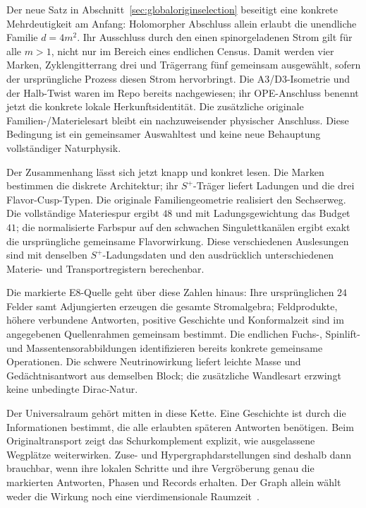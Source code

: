 Der neue Satz in Abschnitt~\ref{sec:globaloriginselection} beseitigt eine konkrete Mehrdeutigkeit am Anfang: Holomorpher Abschluss allein erlaubt die unendliche Familie $d=4m^2$. Ihr Ausschluss durch den einen spinorgeladenen Strom gilt für alle $m>1$, nicht nur im Bereich eines endlichen Census. Damit werden vier Marken, Zyklengitterrang drei und Trägerrang fünf gemeinsam ausgewählt, sofern der ursprüngliche Prozess diesen Strom hervorbringt. Die A3/D3-Isometrie und der Halb-Twist waren im Repo bereits nachgewiesen; ihr OPE-Anschluss benennt jetzt die konkrete lokale Herkunftsidentität. Die zusätzliche originale Familien-/Materielesart bleibt ein nachzuweisender physischer Anschluss. Diese Bedingung ist ein gemeinsamer Auswahltest und keine neue Behauptung vollständiger Naturphysik.

Der Zusammenhang lässt sich jetzt knapp und konkret lesen. Die Marken bestimmen die diskrete Architektur; ihr $S^+$-Träger liefert Ladungen und die drei Flavor-Cusp-Typen. Die originale Familiengeometrie realisiert den Sechserweg. Die vollständige Materiespur ergibt $48$ und mit Ladungsgewichtung das Budget $41$; die normalisierte Farbspur auf den schwachen Singulettkanälen ergibt exakt die ursprüngliche gemeinsame Flavorwirkung. Diese verschiedenen Auslesungen sind mit denselben $S^+$-Ladungsdaten und den ausdrücklich unterschiedenen Materie- und Transportregistern berechenbar.

Die markierte E8-Quelle geht über diese Zahlen hinaus: Ihre ursprünglichen $24$ Felder samt Adjungierten erzeugen die gesamte Stromalgebra; Feldprodukte, höhere verbundene Antworten, positive Geschichte und Konformalzeit sind im angegebenen Quellenrahmen gemeinsam bestimmt. Die endlichen Fuchs-, Spinlift- und Massentensorabbildungen identifizieren bereits konkrete gemeinsame Operationen. Die schwere Neutrinowirkung liefert leichte Masse und Gedächtnisantwort aus demselben Block; die zusätzliche Wandlesart erzwingt keine unbedingte Dirac-Natur.

Der Universalraum gehört mitten in diese Kette. Eine Geschichte ist durch die Informationen bestimmt, die alle erlaubten späteren Antworten benötigen. Beim Originaltransport zeigt das Schurkomplement explizit, wie ausgelassene Wegplätze weiterwirken. Zuse- und Hypergraphdarstellungen sind deshalb dann brauchbar, wenn ihre lokalen Schritte und ihre Vergröberung genau die markierten Antworten, Phasen und Records erhalten. Der Graph allein wählt weder die Wirkung noch eine vierdimensionale Raumzeit~\cite{gorardcausal}.

